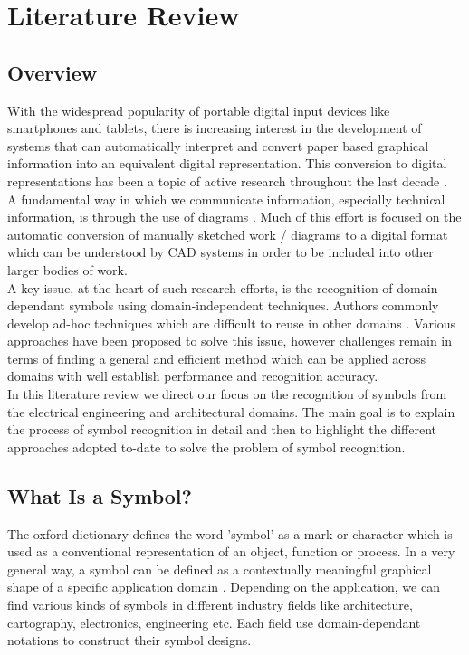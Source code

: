 \chapter{Literature Review}
\label{chap:literature}

\section {Overview}
\label{sec:overview}

With the widespread popularity of portable digital input devices like smartphones and tablets, there is increasing interest in the development of systems that can automatically interpret and convert paper based graphical information into an equivalent digital representation. This conversion to digital representations has been a topic of active research throughout the last decade \cite{Cordella_2000} \cite{Delalandre_2012}. \\

A fundamental way in which we communicate information, especially technical information, is through the use of diagrams \cite{Ouyang_2009}. Much of this effort is focused on the automatic conversion of manually sketched work / diagrams to a digital format which can be understood by CAD systems in order to be included into other larger bodies of work. \\

A key issue, at the heart of such research efforts, is the recognition of domain dependant symbols using domain-independent techniques. Authors commonly develop ad-hoc techniques which are difficult to reuse in other domains \cite{Llados}. Various approaches have been proposed to solve this issue, however challenges remain in terms of finding a general and efficient method which can be applied across domains with well establish performance and recognition accuracy. \\ 


In this literature review we direct our focus on the recognition of symbols from the electrical engineering and architectural domains. The main goal is to explain the process of symbol recognition in detail and then to highlight the different approaches adopted to-date to solve the problem of symbol recognition. \\


\section{What Is a Symbol?}
\label{sec:whatis}
The oxford dictionary defines the word 'symbol' as a mark or character which is used as a conventional representation of an object, function or process. In a very general way, a symbol can be defined as a contextually meaningful graphical shape of a specific application domain \cite{Llados}. Depending on the application, we can find various kinds of symbols in different industry fields like architecture, cartography, 
electronics, engineering etc. Each field use domain-dependant notations to construct their symbol designs. \\

